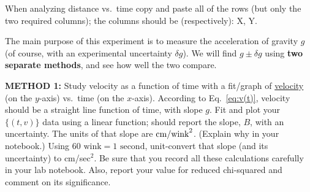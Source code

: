 When analyzing distance vs.\ time copy and paste all of the rows
(but only the two required columns);
the columns should be (respectively): X, Y. 




The main purpose of this experiment is to measure the acceleration of
gravity $g$ (of course, with an experimental uncertainty $\delta g$).  We will
find $g\pm\delta g$ using {\bf two separate methods}, and see how well the two compare.


{\bf METHOD 1: }
Study velocity as a function of time with a
fit/graph of \underline{velocity} (on the $y$-axis) vs.\ time (on the
$x$-axis).  According to Eq.~\ref{eq:v(t)}, velocity should be
a straight line function of time, with slope $g$.  Fit and plot your
$\{(t,v)\}$ data using a linear function; \WAPP should
report the slope, $B$, with an uncertainty.  The units of that slope are
${\rm cm/wink}^2$.  (Explain why in your notebook.) Using
$60\mbox{ wink}=1\mbox{ second}$, unit-convert that slope 
(and its uncertainty) to cm/sec$^2$.
Be sure that you record all these calculations carefully in your lab
notebook.
Also, report your value for reduced chi-squared
and comment on its significance. 



